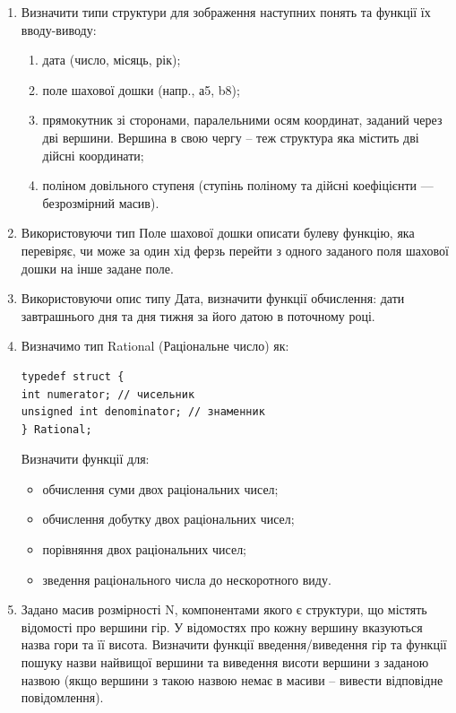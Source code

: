 \documentclass[a5paper,titlepage,openany,twoside,draft]{book_unv}%
\makeatletter
\newcommand{\xslalph}[1]{\expandafter\@xslalph\csname c@#1\endcsname}
\newcommand{\@xslalph}[1]{%
    \ifcase#1\or а\or б\or в\or г\or д\or e\or є\or ж\or з\or i%
    \or й\or к\or л\or м\or н\or о\or п\or р\or с\or т%
    \or у\or ф\or х\or ц\or ч\or ш\or ю\or я\or аа\or бб\or вв%
    \else\@ctrerr\fi%
}
\makeatother
\begin{document}
\begin{enumerate}
\def\labelenumi{\arabic{enumi})}
\item
  Визначити типи структури для зображення наступних понять та функції їх вводу-виводу:
 \begin{enumerate}[label=\xslalph*)]
 \item дата (число, місяць, рік);
 \item поле шахової дошки (напр., а5, b8);
 \item прямокутник зі сторонами, паралельними осям координат, заданий через дві вершини.
Вершина в свою чергу -- теж структура яка містить дві дійсні координати;
 \item поліном довільного ступеня (ступінь поліному та дійсні коефіцієнти --- безрозмірний
масив).
 \end{enumerate}

\item
 Використовуючи тип Поле шахової дошки описати булеву функцію, яка
перевіряє, чи може за один хід ферзь перейти з одного заданого поля
шахової дошки на інше задане поле.

\item
 Використовуючи опис типу Дата, визначити функції обчислення:
дати завтрашнього дня та дня тижня за його датою в поточному році.

\item
 Визначимо тип Rational (Раціональне число) як:
\begin{verbatim}
typedef struct {
int numerator; // чисельник
unsigned int denominator; // знаменник
} Rational;
\end{verbatim}

Визначити функції для:
\begin{itemize}
\item обчислення суми двох раціональних чисел;
\item обчислення добутку двох раціональних чисел;
\item порівняння двох раціональних чисел;
\item зведення раціонального числа до нескоротного виду.
\end{itemize}


\item
 Задано масив розмірності N, компонентами якого є структури, що містять відомості про вершини гір. У
відомостях про кожну вершину вказуються назва гори та її висота.
Визначити функції введення/виведення гір та функції пошуку назви
найвищої вершини та виведення висоти вершини з заданою назвою (якщо
вершини з такою назвою немає в масиви -- вивести відповідне
повідомлення).
\end{enumerate}
\end{document}
